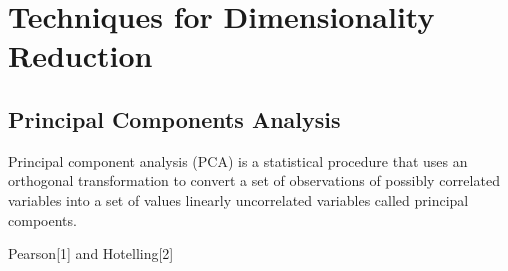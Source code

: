 \chapter{Techniques for Dimensionality Reduction}

\section{Principal Components Analysis}

Principal component analysis (PCA) is a statistical procedure that uses an orthogonal transformation to convert a set of observations of possibly correlated variables into a set of values linearly uncorrelated variables called principal compoents.

Pearson[1] and Hotelling[2]
